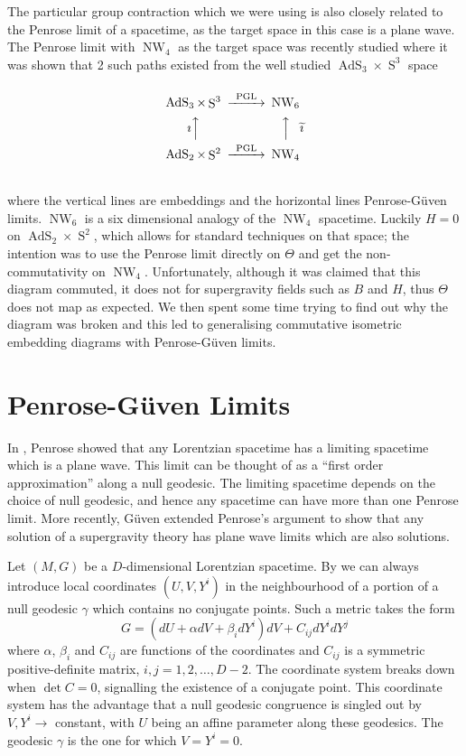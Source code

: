 \documentclass[11pt, a4paper, titlepage]{article}
\DeclareMathOperator{\AdS}{AdS}
\DeclareMathOperator{\Sphere}{S}
\DeclareMathOperator{\NW}{NW}
\let\S\Sphere
\begin{document}
The particular group contraction which we were using is also closely related to
the Penrose limit of a spacetime, as the target space in this case is a plane
wave. The Penrose limit with $\NW_4$ as the target space was recently studied
\cite{pllbnwb} where it was shown that 2 such paths existed from the well
studied $\AdS_3\times\S^3$ space
\begin{equation}
  \label{eq:jose}
  \begin{CD}
    @.\\
    \AdS_3 \times \S^3    @>\text{PGL}>>          \NW_6\\
    \text{$\imath$}@AAA @AAA\text{$\widetilde{\imath}$}\\
    \AdS_2 \times \S^2    @>\text{PGL}>>          \NW_4\\
    @.
  \end{CD}
\end{equation}
where the vertical lines are embeddings and the horizontal lines
Penrose-G\"{u}ven limits. $\NW_6$ is a six dimensional analogy of the $\NW_4$
spacetime. Luckily $H=0$ on $\AdS_2\times\S^2$, which allows for standard
techniques on that space; the intention was to use the Penrose limit directly on
$\Theta$ and get the non-commutativity on $\NW_4$. Unfortunately, although it
was claimed that this diagram commuted, it does not for supergravity fields such
as $B$ and $H$, thus $\Theta$ does not map as expected. We then spent some time
trying to find out why the diagram was broken and this led to generalising
commutative isometric embedding diagrams with Penrose-G\"{u}ven limits.

\section{Penrose-G\"{u}ven Limits}
In \cite{pl}, Penrose showed that any Lorentzian spacetime has a limiting
spacetime which is a plane wave. This limit can be thought of as a ``first order
approximation'' along a null geodesic. The limiting spacetime depends on the
choice of null geodesic, and hence any spacetime can have more than one Penrose
limit. More recently, G\"{u}ven extended Penrose's argument to show that any
solution of a supergravity theory has plane wave limits which are also
solutions.

Let $(M,G)$ be a $D$-dimensional Lorentzian spacetime. By \cite{penrose} we can
always introduce local coordinates $(U,V,Y^i)$ in the neighbourhood of a portion
of a null geodesic $\gamma$ which contains no conjugate points. Such a metric
takes the form
\begin{equation}
  \label{eq:bpg:initial:G}
  G = \left(dU + \alpha dV + \beta_i dY^i \right)dV + C_{ij} dY^i dY^j
\end{equation}
where $\alpha$, $\beta_i$ and $C_{ij}$ are functions of the coordinates and
$C_{ij}$ is a symmetric positive-definite matrix, $i,j=1,2,\ldots,D-2$. The
coordinate system breaks down when $\det{C}=0$, signalling the existence of a
conjugate point. This coordinate system has the advantage that a null geodesic
congruence is singled out by $V,Y^i\rightarrow$ constant, with $U$ being an
affine parameter along these geodesics. The geodesic $\gamma$ is the one for
which $V=Y^i=0$.
\end{document}

